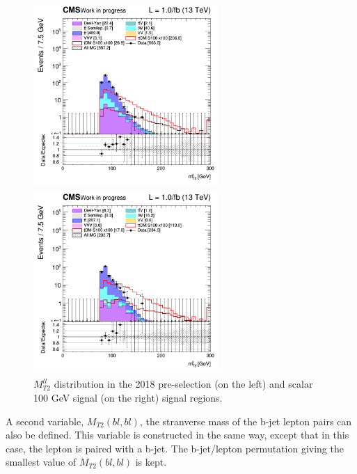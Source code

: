 \documentclass[a4paper, 10pt, openright]{report}
\begin{document}
\begin{figure}[htbp]
\centering
\begin{minipage}[b]{.48\textwidth}
\includegraphics[width=7cm, height=7cm]{figs/2018/SRBlinded-ttDM-scalar100/log_cratio_topCR_ll_mt2ll.png}
\end{minipage}\hfill
\begin{minipage}[b]{.48\textwidth}
\includegraphics[width=7cm, height=7cm]{figs/2018/SRBlinded-ttDM-scalar100/log_cratio_topCR_ll_BDT_ttDM100_mt2ll.png}
\end{minipage} \hfill
\caption{$M_{T2}^{ll}$ distribution in the 2018 pre-selection (on the left) and scalar 100 GeV signal (on the right) signal regions.}
\label{fig:SRdiscMT2}
\end{figure}

A second variable, $M_{T2}(bl, bl)$, the stranverse mass of the b-jet lepton pairs can also be defined. This variable is constructed in the same way, except that in this case, the lepton is paired with a b-jet. The b-jet/lepton permutation giving the smallest value of $M_{T2}(bl, bl)$ is kept. %
\end{document}
